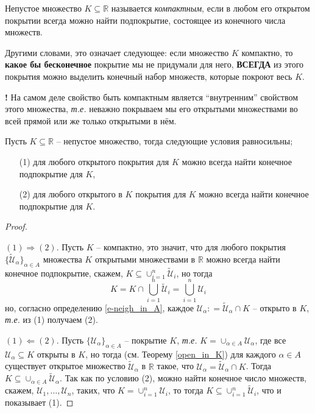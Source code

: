 \begin{definition}
Непустое множество $K \subseteq \mathbb{R}$ называется \textit{компактным}, если в любом его открытом покрытии всегда можно найти подпокрытие, состоящее из конечного числа множеств.
\end{definition}

\begin{comments}
   Другими словами, это означает следующее: если множество $K$ компактно, то \textbf{какое бы бесконечное} покрытие мы не придумали для него, \textbf{ВСЕГДА} из этого покрытия можно выделить конечный набор множеств, которые покроют весь $K$.
\end{comments}

\begin{mydanger}{\bf !}
На самом деле свойство быть компактным является ``внутренним'' свойством этого множества, \textit{т.е.} неважно покрываем мы его открытыми множествами во всей прямой или же только открытыми в нём.
\end{mydanger}

\begin{theorem}
    Пусть $K\subseteq \mathbb{R}$ -- непустое множество, тогда следующие условия равносильны;
    \begin{enumerate}
        \item[(1)] для любого открытого покрытия для $K$ можно всегда найти конечное подпокрытие для $K$,
        \item[(2)] для любого открытого в $K$ покрытия для $K$ можно всегда найти конечное подпокрытие для $K$.
    \end{enumerate}
\end{theorem}

\begin{proof}~

$(1) \Longrightarrow (2).$ Пусть $K$ -- компактно, это значит, что для любого покрытия $\{\widetilde{\mathscr{U}}_\alpha\}_{\alpha \in A}$ множества $K$ открытыми множествами в $\mathbb{R}$ можно всегда найти конечное подпокрытие, скажем, $K \subseteq \cup_{i=1}^n \widetilde{\mathscr{U}}_i$, но тогда 
\[
 K = K \cap \bigcup_{i=1}^n \widetilde{\mathscr{U}}_i= \bigcup_{i=1}^n \mathscr{U}_i
\]
но, согласно определению \ref{e-neigh_in_A}, каждое $\mathscr{U}_\alpha : = \widetilde{\mathscr{U}}_\alpha \cap K$ -- открыто в $K$, \textit{т.е.} из (1) получаем (2).

$(1) \Longleftarrow (2).$ Пусть $\{ \mathscr{U}_\alpha \}_{\alpha \in A}$ -- покрытие $K$, \textit{т.е.} $K = \cup_{\alpha \in A} \mathscr{U}_\alpha$, где все $\mathscr{U}_\alpha \subseteq K$ открыты в $K$, но тогда (см. Теорему \ref{open_in_K}) для каждого $\alpha \in A$ существует открытое множество $\widetilde{\mathscr{U}}_\alpha$ в $\mathbb{R}$ такое, что $\mathscr{U}_\alpha= \widetilde{\mathscr{U}}_\alpha \cap K$. Тогда $K \subseteq \cup_{\alpha \in A} \widetilde{\mathscr{U}}_\alpha.$ Так как по условию (2), можно найти конечное число множеств, скажем, $\mathscr{U}_1, \ldots, \mathscr{U}_n$, таких, что $K = \cup_{i=1}^n\mathscr{U}_i$, то тогда $K \subseteq \cup_{i=1}^n \widetilde{\mathscr{U}}_i$, что и показывает (1).
\end{proof}


